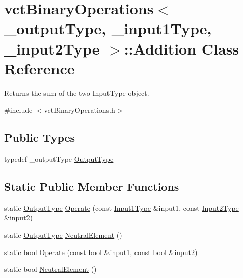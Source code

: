 \hypertarget{classvct_binary_operations_1_1_addition}{\section{vct\-Binary\-Operations$<$ \-\_\-output\-Type, \-\_\-input1\-Type, \-\_\-input2\-Type $>$\-:\-:Addition Class Reference}
\label{classvct_binary_operations_1_1_addition}
}


Returns the sum of the two Input\-Type object.  




{\ttfamily \#include $<$vct\-Binary\-Operations.\-h$>$}

\subsection*{Public Types}
\begin{DoxyCompactItemize}
\item 
typedef \-\_\-output\-Type \hyperlink{classvct_binary_operations_1_1_addition_a2de5d1a14345e7ff12fe79a822941a39}{Output\-Type}
\end{DoxyCompactItemize}
\subsection*{Static Public Member Functions}
\begin{DoxyCompactItemize}
\item 
static \hyperlink{classvct_binary_operations_1_1_addition_a2de5d1a14345e7ff12fe79a822941a39}{Output\-Type} \hyperlink{classvct_binary_operations_1_1_addition_a03e03d9895f4c6cd0e5ade01e22279df}{Operate} (const \hyperlink{classvct_binary_operations_a5e56a66a012d6a28c539a08a0021c45e}{Input1\-Type} \&input1, const \hyperlink{classvct_binary_operations_a929119af557a04a16b4d854981e49e1b}{Input2\-Type} \&input2)
\item 
static \hyperlink{classvct_binary_operations_1_1_addition_a2de5d1a14345e7ff12fe79a822941a39}{Output\-Type} \hyperlink{classvct_binary_operations_1_1_addition_a8528b955a8c147436cb96cca50a5b73f}{Neutral\-Element} ()
\item 
static bool \hyperlink{classvct_binary_operations_1_1_addition_a16fa84f898dcfa2910df990e48efb559}{Operate} (const bool \&input1, const bool \&input2)
\item 
static bool \hyperlink{classvct_binary_operations_1_1_addition_a76415fbc90c8497b7d587f3a60609b0a}{Neutral\-Element} ()
\end{DoxyCompactItemize}


